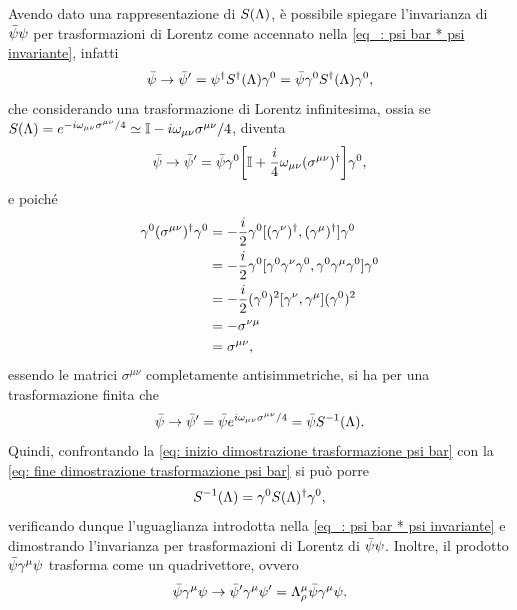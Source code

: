 Avendo dato una rappresentazione di $S(\Lambda)$, è possibile spiegare l'invarianza di $\bar{\psi}\psi$ per trasformazioni di Lorentz come accennato nella \eqref{eq_: psi bar * psi invariante}, infatti
\begin{equation}
\label{eq: inizio dimostrazione trasformazione psi bar}
    \bar{\psi}\to\bar{\psi}' = \psi^\dagger S^\dagger(\Lambda)\gamma^0 = \bar{\psi}\gamma^0S^\dagger(\Lambda)\gamma^0,
\end{equation}
che considerando una trasformazione di Lorentz infinitesima, ossia se $S(\Lambda) = e^{-i\omega_{\mu\nu}\sigma^{\mu\nu}/4}\simeq\mathbb{I} - i\omega_{\mu\nu}\sigma^{\mu\nu}/4$, diventa
\begin{equation}
    \bar{\psi}\to\bar{\psi}' = \bar{\psi}\gamma^0\bigg[\mathbb{I} + \frac{i}{4}\omega_{\mu\nu}(\sigma^{\mu\nu})^\dagger\bigg]\gamma^0,
\end{equation}
e poiché
\begin{equation}
    \begin{split}
        \gamma^0(\sigma^{\mu\nu})^\dagger\gamma^0 &= -\frac{i}{2}\gamma^0[(\gamma^\nu)^\dagger,(\gamma^\mu)^\dagger]\gamma^0 \\
        &= -\frac{i}{2}\gamma^0[\gamma^0\gamma^\nu\gamma^0,\gamma^0\gamma^\mu\gamma^0]\gamma^0 \\
        &= -\frac{i}{2}(\gamma^0)^2[\gamma^\nu,\gamma^\mu](\gamma^0)^2 \\
        &=-\sigma^{\nu\mu} \\
        &= \sigma^{\mu\nu},
    \end{split}
\end{equation}
essendo le matrici $\sigma^{\mu\nu}$ completamente antisimmetriche, si ha per una trasformazione finita che
\begin{equation}
\label{eq: fine dimostrazione trasformazione psi bar}
    \bar{\psi}\to\bar{\psi}' = \bar{\psi} e^{i\omega_{\mu\nu}\sigma^{\mu\nu}/4} = \bar{\psi} S^{-1}(\Lambda).
\end{equation}
Quindi, confrontando la \eqref{eq: inizio dimostrazione trasformazione psi bar} con la \eqref{eq: fine dimostrazione trasformazione psi bar} si può porre
\begin{equation}
    S^{-1}(\Lambda) = \gamma^0S(\Lambda)^\dagger\gamma^0,
\end{equation}
verificando dunque l'uguaglianza introdotta nella \eqref{eq_: psi bar * psi invariante} e dimostrando l'invarianza per trasformazioni di Lorentz di $\bar{\psi}\psi$. Inoltre, il prodotto $\bar{\psi}\gamma^\mu\psi$ trasforma come un quadrivettore, ovvero
\begin{equation}
    \bar{\psi}\gamma^\mu\psi\to\bar{\psi}'\gamma^\mu\psi' = \Lambda_\rho^\mu\bar{\psi}\gamma^\mu\psi.
\end{equation}

